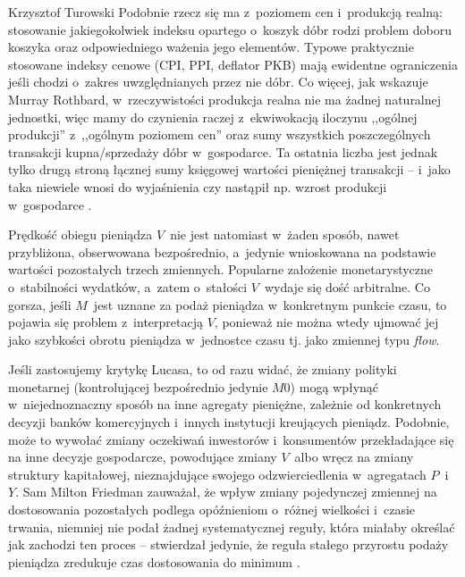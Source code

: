 \begin{artplenv}{Krzysztof Turowski}
Podobnie rzecz się ma z~poziomem cen i~produkcją realną: stosowanie jakiegokolwiek indeksu opartego o~koszyk dóbr rodzi
problem doboru koszyka oraz odpowiedniego ważenia jego elementów. Typowe praktycznie stosowane indeksy cenowe (CPI,
PPI, deflator PKB) mają ewidentne ograniczenia jeśli chodzi o~zakres uwzględnianych przez nie dóbr. Co więcej, jak
wskazuje Murray Rothbard, w~rzeczywistości produkcja realna nie ma żadnej naturalnej jednostki, więc mamy do czynienia
raczej z~ekwiwokacją iloczynu ,,ogólnej produkcji'' z~,,ogólnym poziomem cen'' oraz sumy wszystkich poszczególnych
transakcji kupna/sprzedaży dóbr w~gospodarce. Ta ostatnia liczba jest jednak tylko drugą stroną łącznej sumy księgowej
wartości pieniężnej transakcji  --  i~jako taka niewiele wnosi do wyjaśnienia czy nastąpił np. wzrost
produkcji w~gospodarce
\parencite{rothbard_man_1962}.

Prędkość obiegu pieniądza $V$~nie jest natomiast w~żaden sposób, nawet przybliżona, obserwowana
bezpośrednio, a~jedynie wnioskowana na podstawie wartości pozostałych trzech zmiennych. Popularne założenie
monetarystyczne o~stabilności wydatków, a~zatem o~stałości $V$~wydaje się dość arbitralne. Co gorsza, jeśli $M$~jest uznane
za podaż pieniądza w~konkretnym punkcie czasu, to pojawia się problem z~interpretacją $V$, ponieważ nie można
wtedy ujmować jej jako szybkości obrotu pieniądza w~jednostce czasu tj. jako zmiennej typu \textit{flow}.

Jeśli zastosujemy krytykę Lucasa, to od razu widać, że zmiany polityki monetarnej (kontrolującej bezpośrednio jedynie
$M0$) mogą wpłynąć w~niejednoznaczny sposób na inne agregaty pieniężne, zależnie od
konkretnych decyzji banków komercyjnych i~innych instytucji kreujących pieniądz. Podobnie, może to wywołać zmiany
oczekiwań inwestorów i~konsumentów przekładające się na inne decyzje gospodarcze, powodujące zmiany $V$~albo
wręcz na zmiany struktury kapitałowej, nieznajdujące swojego odzwierciedlenia w~agregatach $P$~i~$Y$.
Sam Milton Friedman zauważał, że wpływ zmiany pojedynczej zmiennej na dostosowania pozostałych podlega
opóźnieniom o~różnej wielkości i~czasie trwania, niemniej nie podał żadnej systematycznej reguły, która miałaby określać jak
zachodzi ten proces  --  stwierdzał jedynie, że reguła stałego przyrostu podaży pieniądza zredukuje czas
dostosowania do minimum
\parencite{friedman_counter-revolution_1996}.


\end{artplenv}
